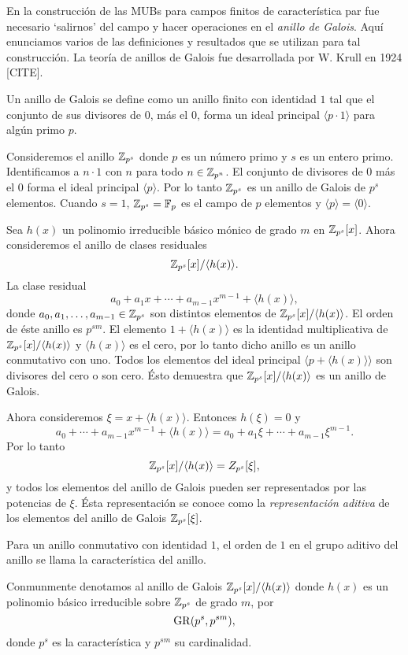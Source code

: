 En la construcción de las MUBs para campos finitos de
característica par fue necesario `salirnos' del campo y
hacer operaciones en el \textit{anillo de Galois}. Aquí
enunciamos varios de las definiciones y resultados que se
utilizan para tal construcción. La teoría de anillos de
Galois fue desarrollada por W. Krull en 1924 [CITE]. 
\begin{definition}
  Un anillo de Galois se define como un anillo finito con
  identidad $1$ tal que el conjunto de sus divisores de 0,
  más el 0, forma un ideal principal $\langle p \cdot 1
  \rangle$ para algún primo $p$.
\end{definition}
\begin{example}
  Consideremos el anillo $\operatorname{\mathbb{Z}}_{p^{s}}$ donde $p$ es un número
  primo y $s$ es un entero primo. Identificamos a $n \cdot
  1$ con $n$ para todo $n \in \operatorname{\mathbb{Z}}_{p^{n}}$. El conjunto de
  divisores de 0 más el 0 forma el ideal principal $\langle
  p\rangle$. Por lo tanto $\operatorname{\mathbb{Z}}_{p^{s}}$ es un anillo de
  Galois de $p^{s}$ elementos. Cuando $s = 1$, $\operatorname{\mathbb{Z}}_{p^{s}} =
  \operatorname{\mathbb{F}}_p$ es el campo de $p$ elementos y $\langle p \rangle =
  \langle 0 \rangle$.
\end{example}
\begin{example}
  Sea $h(x)$ un polinomio irreducible básico mónico de grado
  $m$ en $\operatorname{\mathbb{Z}}_{p^{s}}[x]$. Ahora consideremos el anillo de
  clases residuales
  \[
    \operatorname{\mathbb{Z}}_{p^{s}}[x] / \langle h(x) \rangle.
  \] 
  La clase residual
  \[
    a_0 + a_1 x + \cdots + a_{m-1} x ^{m-1} + \langle h(x)
    \rangle,
  \] 
  donde $a_0,a_1,\ldots,a_{m-1} \in \operatorname{\mathbb{Z}}_{p^{s}}$ son
  distintos elementos de $\operatorname{\mathbb{Z}}_{p^{s}}[x] / \langle h(x)
  \rangle$. El orden de éste anillo es $p^{sm}$. El elemento
  $1 + \langle h(x) \rangle$ es la identidad multiplicativa
  de $\operatorname{\mathbb{Z}}_{p^{s}}[x] / \langle h(x) \rangle$ y $\langle h(x)
  \rangle$ es el cero, por lo tanto dicho anillo es un
  anillo conmutativo con uno. Todos los elementos del ideal
  principal $\langle p + \langle h(x) \rangle \rangle$ son
  divisores del cero o son cero. Ésto demuestra que
  $\operatorname{\mathbb{Z}}_{p^{s}}[x] / \langle h(x) \rangle$ es un anillo de
  Galois.

  Ahora consideremos $\xi = x + \langle h(x) \rangle$.
  Entonces $h(\xi) = 0$ y
  \[
    a_0+\cdots+a_{m-1}x^{m-1} + \langle h(x) \rangle
    = a_0+a_1\xi+\cdots+a_{m-1}\xi^{m-1}.
  \] 
  Por lo tanto
  \[
    \operatorname{\mathbb{Z}}_{p^{s}}[x] / \langle h(x) \rangle
    = Z_{p^{s}}[\xi],
  \] 
  y todos los elementos del anillo de Galois pueden ser
  representados por las potencias de $\xi$. Ésta
  representación se conoce como la \textit{representación
  aditiva} de los elementos del anillo de Galois
  $\operatorname{\mathbb{Z}}_{p^{s}}[\xi]$.
\end{example}
\begin{definition}
  Para un anillo conmutativo con identidad $1$, el orden de
  $1$ en el grupo aditivo del anillo se llama la
  característica del anillo.
\end{definition}
Conmunmente denotamos al anillo de Galois $\operatorname{\mathbb{Z}}_{p^{s}}[x] /
\langle h(x) \rangle$ donde $h(x)$ es un polinomio básico
irreducible sobre $\operatorname{\mathbb{Z}}_{p^{s}}$ de grado $m$, por
\[
  \operatorname{GR}(p^{s}, p^{sm}),
\] 
donde $p^{s}$ es la característica y $p^{sm}$ su
cardinalidad.

